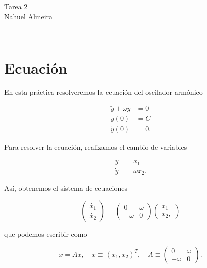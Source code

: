 \documentclass[12pt]{article}
\begin{document}

\graphicspath{{figures/}}

\begin{center}
    Tarea 2 \\
    Nahuel Almeira
\end{center}

\begin{center}
    \Large - \normalsize
\end{center}

\section{Ecuaci\'on}

En esta pr\'actica resolveremos la ecuaci\'on del oscilador arm\'onico 

\begin{align}
\ddot{y} + \omega y &= 0 \\
y(0) &= C \\
\dot{y}(0) &= 0.
\end{align}

Para resolver la ecuaci\'on, realizamos el cambio de variables 

\begin{align}
y &= x_1 \\
\dot{y} &= \omega x_2.
\end{align}

As\'i, obtenemos el sistema de ecuaciones 

\begin{equation}
\begin{pmatrix}
\dot{x_1} \\
\dot{x_2}
\end{pmatrix} = 
\begin{pmatrix}
0 & \omega \\
-\omega & 0
\end{pmatrix}
\begin{pmatrix}
x_1 \\
x_2,
\end{pmatrix}
\end{equation}

que podemos escribir como 

\begin{equation}
\dot{x} = A x, \quad x \equiv (x_1, x_2)^T, \quad A \equiv 
\begin{pmatrix}
0 & \omega \\
-\omega & 0
\end{pmatrix}.
\end{equation}
\end{document}
